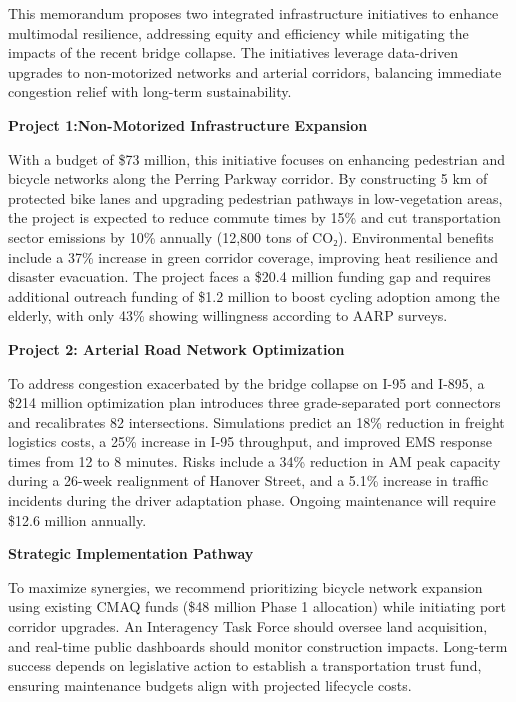 \documentclass{mcmthesis}
\begin{document}
\newpage

  \memodate{\today}

  \begin{memo}[Memorandum]



This memorandum proposes two integrated infrastructure initiatives to enhance multimodal resilience, addressing equity and efficiency while mitigating the impacts of the recent bridge collapse. The initiatives leverage data-driven upgrades to non-motorized networks and arterial corridors, balancing immediate congestion relief with long-term sustainability.


\textbf{Project 1:Non-Motorized Infrastructure Expansion }

With a budget of \$73 million, this initiative focuses on enhancing pedestrian and bicycle networks along the Perring Parkway corridor. By constructing 5 km of protected bike lanes and upgrading pedestrian pathways in low-vegetation areas, the project is expected to reduce commute times by 15\% and cut transportation sector emissions by 10\% annually (12,800 tons of CO₂). Environmental benefits include a 37\% increase in green corridor coverage, improving heat resilience and disaster evacuation. The project faces a \$20.4 million funding gap and requires additional outreach funding of \$1.2 million to boost cycling adoption among the elderly, with only 43\% showing willingness according to AARP surveys.


\textbf{Project 2: Arterial Road Network Optimization}

To address congestion exacerbated by the bridge collapse on I-95 and I-895, a \$214 million optimization plan introduces three grade-separated port connectors and recalibrates 82 intersections. Simulations predict an 18\% reduction in freight logistics costs, a 25\% increase in I-95 throughput, and improved EMS response times from 12 to 8 minutes. Risks include a 34\% reduction in AM peak capacity during a 26-week realignment of Hanover Street, and a 5.1\% increase in traffic incidents during the driver adaptation phase. Ongoing maintenance will require \$12.6 million annually.


\textbf{Strategic Implementation Pathway }

To maximize synergies, we recommend prioritizing bicycle network expansion using existing CMAQ funds (\$48 million Phase 1 allocation) while initiating port corridor upgrades. An Interagency Task Force should oversee land acquisition, and real-time public dashboards should monitor construction impacts. Long-term success depends on legislative action to establish a transportation trust fund, ensuring maintenance budgets align with projected lifecycle costs.



\end{memo}
\end{document}

